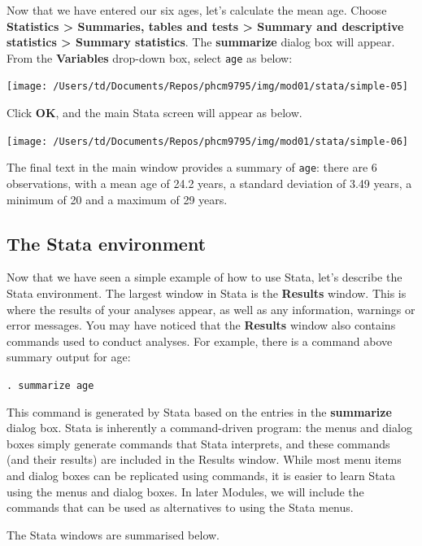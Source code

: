 \documentclass[
]{memoir}
\begin{document}
Now that we have entered our six ages, let's calculate the mean age. Choose \textbf{Statistics \textgreater{} Summaries, tables and tests \textgreater{} Summary and descriptive statistics \textgreater{} Summary statistics}. The \textbf{summarize} dialog box will appear. From the \textbf{Variables} drop-down box, select \texttt{age} as below:

\texttt{[image: /Users/td/Documents/Repos/phcm9795/img/mod01/stata/simple-05]}

Click \textbf{OK}, and the main Stata screen will appear as below.

\texttt{[image: /Users/td/Documents/Repos/phcm9795/img/mod01/stata/simple-06]}

The final text in the main window provides a summary of \texttt{age}: there are 6 observations, with a mean age of 24.2 years, a standard deviation of 3.49 years, a minimum of 20 and a maximum of 29 years.

\hypertarget{the-stata-environment}{%
\subsection{The Stata environment}\label{the-stata-environment}}

Now that we have seen a simple example of how to use Stata, let's describe the Stata environment. The largest window in Stata is the \textbf{Results} window. This is where the results of your analyses appear, as well as any information, warnings or error messages. You may have noticed that the \textbf{Results} window also contains commands used to conduct analyses. For example, there is a command above summary output for age:

\texttt{.\ summarize\ age}

This command is generated by Stata based on the entries in the \textbf{summarize} dialog box. Stata is inherently a command-driven program: the menus and dialog boxes simply generate commands that Stata interprets, and these commands (and their results) are included in the Results window. While most menu items and dialog boxes can be replicated using commands, it is easier to learn Stata using the menus and dialog boxes. In later Modules, we will include the commands that can be used as alternatives to using the Stata menus.

The Stata windows are summarised below.
\end{document}
